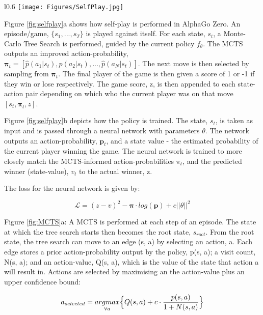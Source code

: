 \documentclass[a4paper]{article}
\newcommand{\loss}{\mathcal{L}}
\begin{document}
\begin{wrapfigure}{l}{0.6\textwidth}
   \centering
   \texttt{[image: Figures/SelfPlay.jpg]}
   \caption{A schematic showing how self-play and policy training are performed. Taken from \cite{AlphaGoZero}.}
   \label{fig:selfplay} 
\end{wrapfigure}

Figure \ref{fig:selfplay}a
shows how self-play is performed in AlphaGo Zero. An episode/game, $\{s_1, ..., s_T\}$ is played against itself. For each state, $s_t$, a Monte-Carlo Tree Search is performed, guided by the current policy $f_\theta$. The MCTS outputs an improved action-probability, $\boldsymbol{\pi}_t = [\hat{p}(a_1|s_t), \hat{p}(a_2|s_t), ..., \hat{p}(a_N|s_t)]$. The next move is then selected by sampling from $\boldsymbol{\pi}_t$. The final player of the game is then given a score of 1 or -1 if they win or lose respectively. The game score, z, is then appended to each state-action pair depending on which who the current player was on that move $[s_t, \boldsymbol{\pi}_t, z]$. 

Figure \ref{fig:selfplay}b
depicts how the policy is trained. The state, $s_t$, is taken as input and is passed through a neural network with parameters $\theta$. The network outputs an action-probability, $\boldsymbol{p}_t$, and a state value - the estimated probability of the current player winning the game. The neural network is trained to more closely match the MCTS-informed action-probabilities $\pi_t$, and the predicted winner (state-value), $v_t$ to the actual winner, z.

The loss for the neural network is given by:

\begin{equation}
   \loss = (z - v)^2 - \boldsymbol{\pi} \cdot log(\boldsymbol{p}) + c||\theta||^2
   \label{eqn:loss}
\end{equation}

Figure \ref{fig:MCTS}a:
A MCTS is performed at each step of an episode. The state at which the tree search starts then becomes the root state, $s_{root}$. From the root state, the tree search can move to an edge (s, a) by selecting an action, a. Each edge stores a prior action-probability output by the policy, p(s, a); a visit count, N(s, a); and an action-value, Q(s, a), which is the value of the state that action a will result in. Actions are selected by maximising an the action-value plus an upper confidence bound:

\begin{equation}
   a_{selected} = \underset{\forall a}{argmax} \Big{\{}Q(s, a) + c \cdot \frac{p(s, a)}{1 + N(s, a)}\Big{\}}
   \label{eqn:ucb}
\end{equation}
\end{document}
